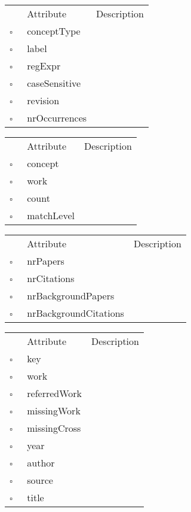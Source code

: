 \begin{table}
\caption{Concept  }

\begin{longtable}{llp{8cm}}
& Attribute & Description \\
$\square$\ & conceptType &  \\
$\square$\ & label &  \\
$\square$\ & regExpr &  \\
$\square$\ & caseSensitive &  \\
$\square$\ & revision &  \\
$\square$\ & nrOccurrences &  \\
\end{longtable}
\label{attr:Concept}
\end{table}

\begin{table}
\caption{ConceptWork  }

\begin{longtable}{llp{8cm}}
& Attribute & Description \\
$\square$\ & concept &  \\
$\square$\ & work &  \\
$\square$\ & count &  \\
$\square$\ & matchLevel &  \\
\end{longtable}
\label{attr:ConceptWork}
\end{table}

\begin{table}
\caption{ConferenceSeries  }

\begin{longtable}{llp{8cm}}
& Attribute & Description \\
$\square$\ & nrPapers &  \\
$\square$\ & nrCitations &  \\
$\square$\ & nrBackgroundPapers &  \\
$\square$\ & nrBackgroundCitations &  \\
\end{longtable}
\label{attr:ConferenceSeries}
\end{table}

\clearpage
\begin{table}
\caption{CrossReference  }

\begin{longtable}{llp{8cm}}
& Attribute & Description \\
$\square$\ & key &  \\
$\square$\ & work &  \\
$\square$\ & referredWork &  \\
$\square$\ & missingWork &  \\
$\square$\ & missingCross &  \\
$\square$\ & year &  \\
$\square$\ & author &  \\
$\square$\ & source &  \\
$\square$\ & title &  \\
\end{longtable}
\label{attr:CrossReference}
\end{table}

